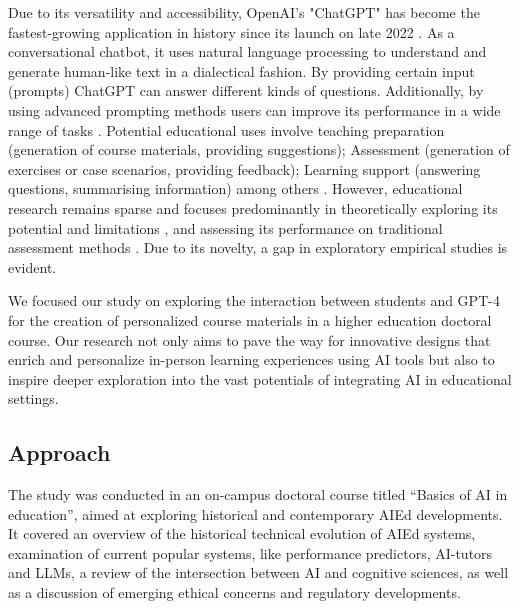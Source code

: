 \documentclass[sn-mathphys, Numbered]{sn-jnl}%
\theoremstyle{thmstyleone}%
\theoremstyle{thmstyletwo}%
\theoremstyle{thmstylethree}%
\begin{document}
Due to its versatility and accessibility, OpenAI's "ChatGPT" has become the fastest-growing application in history since its launch on late 2022 \parencite{milmo_chatgpt_2023}. As a conversational chatbot, it uses natural language processing to understand and generate human-like text in a dialectical fashion. By providing certain input (prompts) ChatGPT can answer different kinds of questions. Additionally, by using advanced prompting methods users can improve its performance in a wide range of tasks \parencite{wei_chain--thought_2023,fernando_promptbreeder_2023}. Potential educational uses involve teaching preparation (generation of course materials, providing suggestions); Assessment (generation of exercises or case scenarios, providing feedback); Learning support (answering questions, summarising information) among others \parencite{lo_what_2023,montenegro-rueda_impact_2023}.  However, educational research remains sparse and focuses predominantly in theoretically exploring its potential and limitations \parencite{qadir_engineering_2022,cain_gpteammate_2023}, and assessing its performance on traditional assessment methods \parencite{nisar_is_2023}. Due to its novelty, a gap in exploratory empirical studies is evident.

We focused our study on exploring the interaction between students and GPT-4 for the creation of personalized course materials in a higher education doctoral course. Our research not only aims to pave the way for innovative designs that enrich and personalize in-person learning experiences using AI tools but also to inspire deeper exploration into the vast potentials of integrating AI in educational settings. 




\subsection*{Approach}\label{Approach}  


The study was conducted in an on-campus doctoral course titled “Basics of AI in education”, aimed at exploring historical and contemporary AIEd developments. It covered an overview of the historical technical evolution of AIEd systems, examination of current popular systems, like performance predictors, AI-tutors and LLMs, a review of the intersection between AI and cognitive sciences, as well as a discussion of emerging ethical concerns and regulatory developments. 
\end{document}
